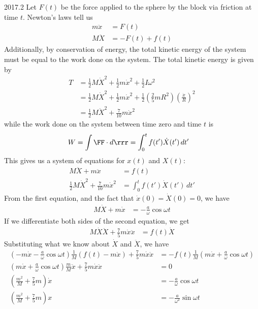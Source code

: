 \documentclass[12pt]{article}
\begin{document}
\begin{solution}{2017.2}
Let $F(t)$ be the force applied to the sphere by the block via friction at time $t$.
Newton's laws tell us
\begin{align*}
m \ddot{x} & = F(t) \\
M \ddot{X} & = -F(t) + f(t)
\end{align*}
Additionally, by conservation of energy, the total kinetic energy of the system must be equal to the work done on the system.
The total kinetic energy is given by
\begin{align*}
T & = \frac{1}{2} M \dot{X}^2 + \frac{1}{2} m \dot{x}^2 + \frac{1}{2} I \omega^2 \\
& = \frac{1}{2} M \dot{X}^2 + \frac{1}{2} m \dot{x}^2 
+ \frac{1}{2} \left( \frac{2}{5} m R^2 \right) \left( \frac{\dot{x}}{R} \right)^2 \\
& = \frac{1}{2} M \dot{X}^2 + \frac{7}{10} m \dot{x}^2 
\end{align*}
while the work done on the system between time zero and time $t$ is
\begin{align*}
W & = \int \FF \cdot d\rrr = \int_0^t f(t') \dot{X}(t') \, dt'
\end{align*}
This gives us a system of equations for $x(t)$ and $X(t)$:
\begin{align*}
M \ddot{X} + m \ddot{x} & = f(t) \\
\frac{1}{2} M \dot{X}^2 + \frac{7}{10} m \dot{x}^2 & = \int_0^t f(t') \dot{X}(t') \, dt'
\end{align*}
From the first equation, and the fact that $\dot{x}(0) = \dot{X}(0) = 0$, we have
\begin{align*}
M\dot{X} + m \dot{x} & = - \frac{a}{\omega} \cos \omega t
\end{align*}
If we differentiate both sides of the second equation, we get
\begin{align*}
M \dot{X} \ddot{X} + \frac{7}{5} m \dot{x} \ddot{x} & = f(t) \dot{X}
\end{align*}
Substituting what we know about $\dot{X}$ and $\ddot{X}$, we have
\begin{align*}
\left( -m \dot{x} - \frac{a}{\omega} \cos \omega t \right) 
\frac{1}{M} (f(t) - m \ddot{x}) + \frac{7}{5} m \dot{x} \ddot{x}
& = -f(t) \frac{1}{M} \left( m \dot{x} + \frac{a}{\omega} \cos \omega t \right) \\
\left( m \dot{x} + \frac{a}{\omega} \cos \omega t \right) \frac{m}{M} \ddot{x}
+ \frac{7}{5} m \dot{x} \ddot{x} & = 0 \\
\left( \frac{m^2}{M} + \frac{7}{5} m \right) \dot{x} & = -\frac{a}{\omega} \cos \omega t \\
\left( \frac{m^2}{M} + \frac{7}{5} m \right) x & = -\frac{a}{\omega^2} \sin \omega t \\
\end{align*}

\end{solution}
\end{document}
